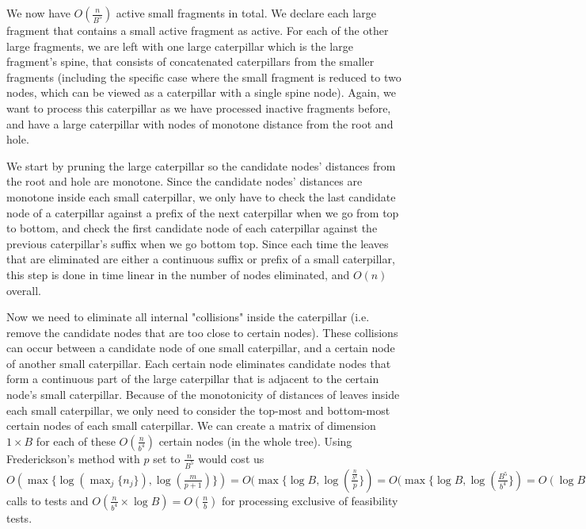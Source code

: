 \documentclass[11pt,a4paper]{article}
\theoremstyle{definition}
\theoremstyle{remark}
\begin{document}
We now have $O(\frac{n}{B^5})$ active small fragments in total. We declare each large fragment that contains a small active fragment as active. For each of the other large fragments, we are left with one large caterpillar which is the large fragment's spine, that consists of concatenated caterpillars from the smaller fragments (including the specific case where the small fragment is reduced to two nodes, which can be viewed as a caterpillar with a single spine node). Again, we want to process this caterpillar as we have processed inactive fragments before, and have a large caterpillar with nodes of monotone distance from the root and hole.

We start by pruning the large caterpillar so the candidate nodes' distances from the root and hole are monotone. Since the candidate nodes' distances are monotone inside each small caterpillar, we only have to check the last candidate node of a caterpillar against a prefix of the next caterpillar when we go from top to bottom, and check the first candidate node of each caterpillar against the previous caterpillar's suffix when we go bottom top. Since each time the leaves that are eliminated are either a continuous suffix or prefix of a small caterpillar, this step is done in time linear in the number of nodes eliminated, and $O(n)$ overall.

Now we need to eliminate all internal "collisions" inside the caterpillar (i.e. remove the candidate nodes that are too close to certain nodes). These collisions can occur between a candidate node of one small caterpillar, and a certain node of another small caterpillar. Each certain node eliminates candidate nodes that form a continuous part of the large caterpillar that is adjacent to the certain node's small caterpillar. Because of the monotonicity of distances of leaves inside each small caterpillar, we only need to consider the top-most and bottom-most certain nodes of each small caterpillar. We can create a matrix of dimension $1 \times B$ for each of these $O(\frac{n}{b^4})$ certain nodes (in the whole tree). Using Frederickson's method with $p$ set to $\frac{n}{B^5}$ would cost us $O(\max \lbrace \log(\max_{j} \lbrace n_j \rbrace), \log(\frac{m}{p+1}) \rbrace) = O(\max \lbrace \log B, \log(\frac{\frac{n}{b^4}}{p} \rbrace) = O(\max \lbrace \log B, \log(\frac{B^5}{b^4} \rbrace) = O(\log B)$ calls to tests and $O(\frac{n}{b^4} \times \log B) = O(\frac{n}{b})$ for processing exclusive of feasibility tests.
\end{document}
